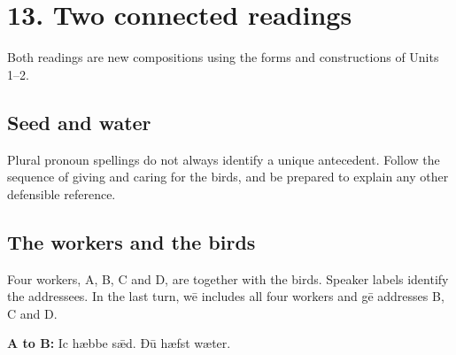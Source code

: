 \section*{13. Two connected readings}

Both readings are new compositions using the forms and constructions of Units 1–2.

\subsection*{Seed and water}

\par\begin{minipage}{\linewidth}\raggedright
{}
\end{minipage}\par

Plural pronoun spellings do not always identify a unique antecedent. Follow the sequence of giving and caring for the birds, and be prepared to explain any other defensible reference.

\subsection*{The workers and the birds}

Four workers, A, B, C and D, are together with the birds. Speaker labels identify the addressees. In the last turn, wē includes all four workers and gē addresses B, C and D.

\textbf{A to B:} Ic hæbbe sǣd. Ðū hæfst wæter.

